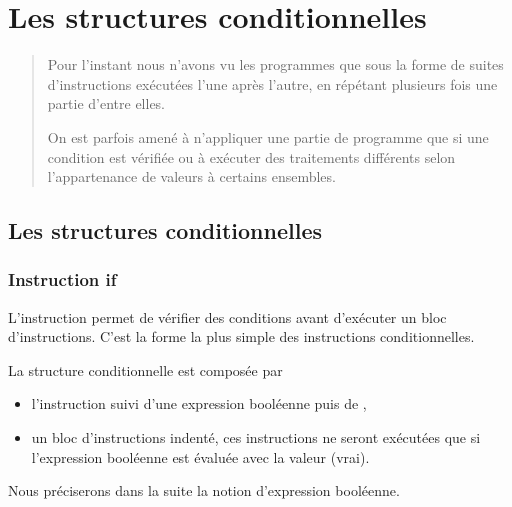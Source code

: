 \chapter{Les structures conditionnelles}
\thispagestyle{empty}
\begin{abstract}
Pour l'instant nous n'avons vu les programmes que sous la forme de suites d'instructions exécutées l'une après l'autre, en répétant plusieurs fois une partie d'entre elles.

On est parfois amené à n'appliquer une partie de programme que si une condition est vérifiée ou à exécuter des traitements différents selon l'appartenance de valeurs à certains ensembles.
\end{abstract}
\section{Les structures conditionnelles}
\subsection{Instruction if}
L'instruction  permet de vérifier des conditions avant d'exécuter un bloc d'instructions. C'est la forme la plus simple des instructions conditionnelles.
\begin{defin}
La structure conditionnelle est composée par 
\begin{itemize}
 \item l'instruction  suivi d'une expression booléenne puis de \type{:},
 \item un bloc d'instructions indenté, ces instructions ne seront exécutées que si l'expression booléenne est évaluée avec la valeur  (vrai).
\end{itemize}
\end{defin}
Nous préciserons dans la suite la notion d'expression booléenne.


